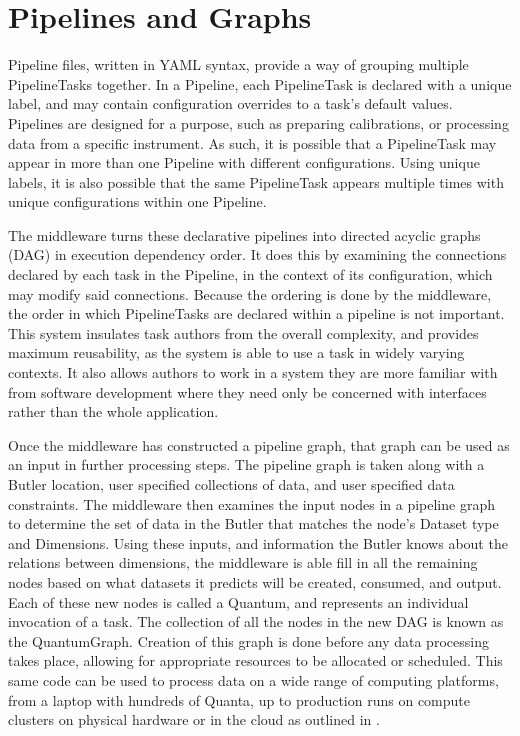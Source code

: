 \documentclass[11pt,twoside]{article}
\begin{document}
\section{Pipelines and Graphs}
Pipeline files, written in YAML syntax, provide a way of grouping multiple PipelineTasks together. In a Pipeline, each PipelineTask is declared with a unique label, and may contain configuration overrides to a task's default values. Pipelines are designed for a purpose, such as preparing calibrations, or processing data from a specific instrument. As such, it is possible that a PipelineTask may appear in more than one Pipeline with different configurations. Using unique labels, it is also possible that the same PipelineTask appears multiple times with unique configurations within one Pipeline.

The middleware turns these declarative pipelines into directed acyclic graphs (DAG) in execution dependency order. It does this by examining the connections declared by each task in the Pipeline, in the context of its configuration, which may modify said connections. Because the ordering is done by the middleware, the order in which PipelineTasks are declared within a pipeline is not important. This system insulates task authors from the overall complexity, and provides maximum reusability, as the system is able to use a task in widely varying contexts. It also allows authors to work in a system they are more familiar with from software development where they need only be concerned with interfaces rather than the whole application.

Once the middleware has constructed a pipeline graph, that graph can be used as an input in further processing steps. The pipeline graph is taken along with a Butler location, user specified collections of data, and user specified data constraints.  The middleware then examines the input nodes in a pipeline graph to determine the set of data in the Butler that matches the node's Dataset type and Dimensions. Using these inputs, and information the Butler knows about the relations between dimensions, the middleware is able fill in all the remaining nodes based on what datasets it predicts will be created, consumed, and output. Each of these new nodes is called a Quantum, and represents an individual invocation of a task. The collection of all the nodes in the new DAG is known as the QuantumGraph. Creation of this graph is done before any data processing takes place, allowing for appropriate resources to be allocated or scheduled. This same code can be used to process data on a wide range of computing platforms, from a laptop with hundreds of Quanta, up to production runs on compute clusters on physical hardware or in the cloud as outlined in \citet{P52_adassxxxii}.
\end{document}
